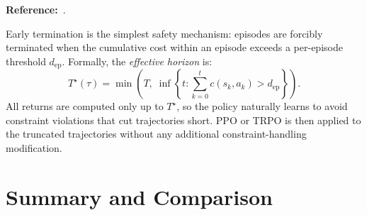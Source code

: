 \documentclass[12pt,a4paper]{article}
\theoremstyle{definition}
\begin{document}
\textbf{Reference:}~\citet{ji2023omnisafe}.

Early termination is the simplest safety mechanism: episodes are forcibly terminated when
the cumulative cost within an episode exceeds a per-episode threshold $d_{\mathrm{ep}}$.
Formally, the \emph{effective horizon} is:
\begin{equation}
  T^\star(\tau) = \min\!\left(T,\; \inf\!\left\{t : \sum_{k=0}^t c(s_k,a_k) > d_{\mathrm{ep}}\right\}\right).
\end{equation}
All returns are computed only up to $T^\star$, so the policy naturally learns to avoid
constraint violations that cut trajectories short. PPO or TRPO is then applied to the
truncated trajectories without any additional constraint-handling modification.

\section{Summary and Comparison}
\label{sec:summary}
\end{document}

